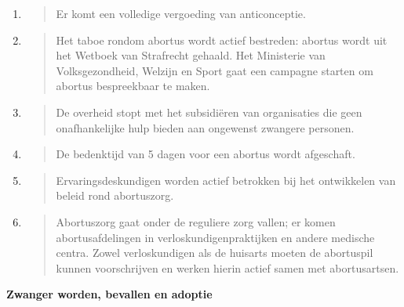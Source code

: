 \begin{enumerate}
\def\labelenumi{\arabic{enumi}.}
\item
  \begin{quote}
  Er komt een volledige vergoeding van anticonceptie.
  \end{quote}
\item
  \begin{quote}
  Het taboe rondom abortus wordt actief bestreden: abortus wordt uit het
  Wetboek van Strafrecht gehaald. Het Ministerie van Volksgezondheid,
  Welzijn en Sport gaat een campagne starten om abortus bespreekbaar te
  maken.
  \end{quote}
\item
  \begin{quote}
  De overheid stopt met het subsidiëren van organisaties die geen
  onafhankelijke hulp bieden aan ongewenst zwangere personen.
  \end{quote}
\item
  \begin{quote}
  De bedenktijd van 5 dagen voor een abortus wordt afgeschaft.
  \end{quote}
\item
  \begin{quote}
  Ervaringsdeskundigen worden actief betrokken bij het ontwikkelen van
  beleid rond abortuszorg.
  \end{quote}
\item
  \begin{quote}
  Abortuszorg gaat onder de reguliere zorg vallen; er komen
  abortusafdelingen in verloskundigenpraktijken en andere medische
  centra. Zowel verloskundigen als de huisarts moeten de abortuspil
  kunnen voorschrijven en werken hierin actief samen met abortusartsen.
  \end{quote}
\end{enumerate}

\textbf{Zwanger worden, bevallen en adoptie}

